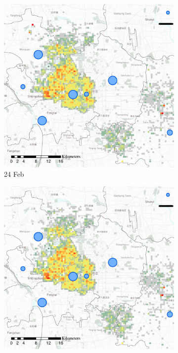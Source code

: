 \documentclass[preprints,ijgi,submit,moreauthors]{Definitions/mdpi}
\begin{document}
\begin{figure}[ht]
    \vspace{6pt}
    \begin{subfigure}{.3\textwidth}
        \includegraphics[width=\textwidth]{Figures/Relation_with_confrimed_cases/NewDistrictSSBD2020_02_24.eps}
        \caption{24 Feb}
    \end{subfigure}
    \begin{subfigure}{.3\textwidth}
        \includegraphics[width=\textwidth]{Figures/Relation_with_confrimed_cases/NewDistrictSSBD2020_02_28.eps}

\end{subfigure}
\end{figure}
\end{document}
